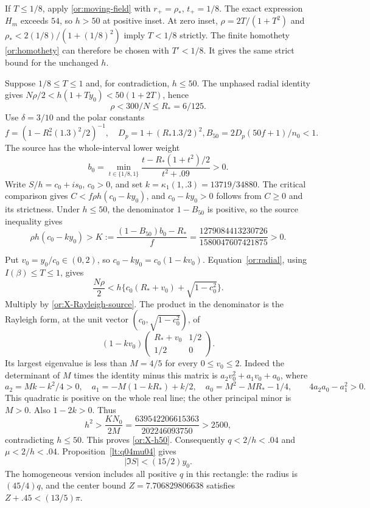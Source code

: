 If $T\le1/8$, apply \eqref{or:moving-field} with
$r_+=\rho_*$, $t_+=1/8$.  The exact expression $H_m$ exceeds $54$,
so $h>50$ at positive inset.  At zero inset,
$\rho=2T/(1+T^2)$ and
$\rho_*<2(1/8)/(1+(1/8)^2)$ imply $T<1/8$ strictly.
The finite homothety \eqref{or:homothety} can therefore be chosen
with $T'<1/8$.  It gives the same strict bound for the unchanged $h$.

Suppose $1/8\le T\le1$ and, for contradiction, $h\le50$.
The unphased radial identity gives
$N\rho/2<h(1+Ty_0)<50(1+2T)$, hence
\[
                           \rho<300/N\le R_*=6/125.
\]
Use $\delta=3/10$ and the polar constants
\[
 f=(1-R_*^2(1.3)^2/2)^{-1},\quad D_p=1+(R_*1.3/2)^2,
                 B_{50}=2D_p(50f+1)/n_0<1.
\]
The source has the whole-interval lower weight
\[
 b_0=\min_{t\in\{1/8,1\}}
                 \frac{t-R_*(1+t^2)/2}{t^2+.09}>0.
\]
Write $S/h=c_0+is_0$, $c_0>0$, and set
$k=\kappa_1(1,.3)=13719/34880$.  The critical comparison gives
$C<f\rho h(c_0-ky_0)$, and $c_0-ky_0>0$ follows from $C\ge0$
and its strictness.  Under $h\le50$, the denominator $1-B_{50}$
is positive, so the source inequality gives
\begin{equation}\label{or:X-Rayleigh-source}
 \rho h(c_0-ky_0)>K:=\frac{(1-B_{50})b_0-R_*}{f}
                 =\frac{1279084413230726}{1580047607421875}>0.
\end{equation}

Put $v_0=y_0/c_0\in(0,2)$, so $c_0-ky_0=c_0(1-kv_0)$.
Equation~\eqref{or:radial}, using $I(\beta)\le T\le1$, gives
\[
 \frac{N\rho}{2}<h\{c_0(R_*+v_0)+\sqrt{1-c_0^2}\}.
\]
Multiply by \eqref{or:X-Rayleigh-source}.
The product in the denominator is the Rayleigh form, at the unit
vector $(c_0,\sqrt{1-c_0^2})$, of
\[
             (1-kv_0)
             \begin{pmatrix}R_*+v_0&1/2\\1/2&0\end{pmatrix}.
\]
Its largest eigenvalue is less than $M=4/5$ for every
$0\le v_0\le2$.  Indeed the determinant of $M$ times the identity
minus this matrix is $a_2v_0^2+a_1v_0+a_0$, where
\[
 a_2=Mk-k^2/4>0,\quad
 a_1=-M(1-kR_*)+k/2,\quad a_0=M^2-MR_*-1/4,
 \qquad 4a_2a_0-a_1^2>0.
\]
This quadratic is positive on the whole real line; the other principal
minor is $M>0$.  Also $1-2k>0$.  Thus
\[
 h^2>\frac{KN_0}{2M}
      =\frac{639542206615363}{202246093750}>2500,
\]
contradicting $h\le50$.  This proves \eqref{or:X-h50}.
Consequently $q<2/h<.04$ and $\mu<2/h<.04$.
Proposition~\ref{lt:q04mu04} gives
\begin{equation}\label{or:X-low-phase}
                              |\Im S|<(15/2)y_0.
\end{equation}
The homogeneous version includes all positive $q$ in this rectangle:
the radius is $(45/4)q$, and the center bound
$Z=7.706829806638$ satisfies $Z+.45<(13/5)\pi$.

